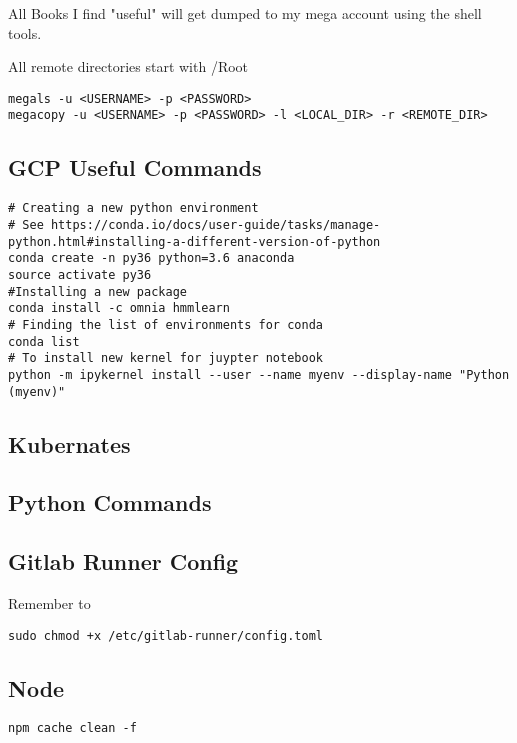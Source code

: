All Books I find "useful" will get dumped to my mega account using the
shell tools.

All remote directories start with /Root

\begin{verbatim}
megals -u <USERNAME> -p <PASSWORD>
megacopy -u <USERNAME> -p <PASSWORD> -l <LOCAL_DIR> -r <REMOTE_DIR>
\end{verbatim}

\subsection{GCP Useful Commands}\label{gcp-useful-commands}

\begin{verbatim}
# Creating a new python environment 
# See https://conda.io/docs/user-guide/tasks/manage-python.html#installing-a-different-version-of-python
conda create -n py36 python=3.6 anaconda
source activate py36
#Installing a new package 
conda install -c omnia hmmlearn
# Finding the list of environments for conda 
conda list 
# To install new kernel for juypter notebook 
python -m ipykernel install --user --name myenv --display-name "Python (myenv)"
\end{verbatim}

\subsection{Kubernates}\label{kubernates}

\subsection{Python Commands}\label{python-commands}


\subsection{Gitlab Runner Config}\label{gitlab-runner-config}

Remember to

\begin{verbatim}
sudo chmod +x /etc/gitlab-runner/config.toml
\end{verbatim}


\subsection{Node}\label{node}

\begin{verbatim}
npm cache clean -f
\end{verbatim}


